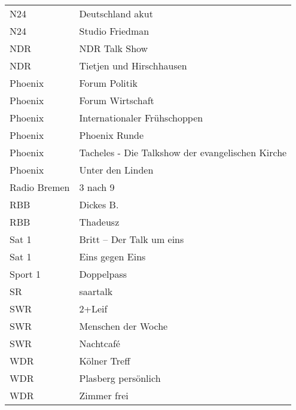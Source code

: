 \begin{table}[!htp]
{\begin{tabular}{@{}ll@{}}
			N24             & Deutschland akut                                 \\
			N24             & Studio Friedman                                  \\ \midrule
			NDR             & NDR Talk Show                                    \\
			NDR             & Tietjen und Hirschhausen                         \\ \midrule
			Phoenix         & Forum Politik                                    \\
			Phoenix         & Forum Wirtschaft                                 \\
			Phoenix         & Internationaler Frühschoppen                     \\
			Phoenix         & Phoenix Runde                                    \\
			Phoenix         & Tacheles - Die Talkshow der evangelischen Kirche \\
			Phoenix         & Unter den Linden                                 \\ \midrule
			Radio Bremen    & 3 nach 9                                         \\ \midrule
			RBB             & Dickes B.                                        \\
			RBB             & Thadeusz                                         \\ \midrule
			Sat 1           & Britt – Der Talk um eins                         \\
			Sat 1           & Eins gegen Eins                                  \\ \midrule
			Sport 1         & Doppelpass                                       \\ \midrule
			SR              & saartalk                                         \\ \midrule
			SWR             & 2+Leif                                           \\
			SWR             & Menschen der Woche                               \\
			SWR             & Nachtcafé                                        \\ \midrule
			WDR             & Kölner Treff                                     \\
			WDR             & Plasberg persönlich                              \\
			WDR             & Zimmer frei                                      \\ \midrule

\end{tabular}}
\end{table}
